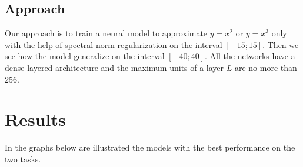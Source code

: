 \documentclass{article}
\begin{document}
$$$$

\subsection{Approach}

Our approach is to train a neural model to approximate $y=x^{2}$ or $y=x^{3}$ only with the help of spectral norm regularization on the interval $[-15;15]$. Then we see how the model generalize on the interval $[-40;40]$. All the networks have a dense-layered architecture and the maximum units of a layer $L$ are no more than 256.







\section{Results}
\label{Results}
 
In the graphs below are illustrated the models with the best performance on the two tasks.
\end{document}
